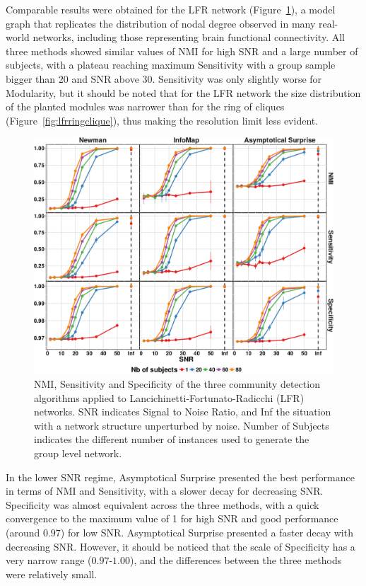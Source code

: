 Comparable results were obtained for the LFR network (Figure~\ref{fig:nmisensitivityspecificitylfr}), a model graph that replicates the distribution of nodal degree observed in many real-world networks, including those representing brain functional connectivity.
All three methods showed similar values of NMI for high SNR and a large number of subjects, with a plateau reaching maximum Sensitivity with a group sample bigger than $20$ and SNR above $30$.
Sensitivity was only slightly worse for Modularity, but it should be noted that for the LFR network the size distribution of the planted modules was narrower than for the ring of cliques (Figure~\ref{fig:lfrringclique}), thus making the resolution limit less evident.

\begin{figure}[htb!]
\includegraphics[width=\textwidth]{images/pacopaperfigure5.pdf}
\caption{NMI, Sensitivity and Specificity of the three community detection algorithms applied to Lancichinetti-Fortunato-Radicchi (LFR) networks. SNR indicates Signal to Noise Ratio, and Inf the situation with a network structure unperturbed by noise. Number of Subjects indicates the different number of instances used to generate the group level network.}
\label{fig:nmisensitivityspecificitylfr}
\end{figure}


In the lower SNR regime, Asymptotical Surprise presented the best performance in terms of NMI and Sensitivity, with a slower decay for decreasing SNR. 
Specificity was almost equivalent across the three methods, with a quick convergence to the maximum value of 1 for high SNR and good performance (around $0.97$) for low SNR.
Asymptotical Surprise presented a faster decay with decreasing SNR.
However, it should be noticed that the scale of Specificity has a very narrow range ($0.97$-$1.00$), and the differences between the three methods were relatively small.

